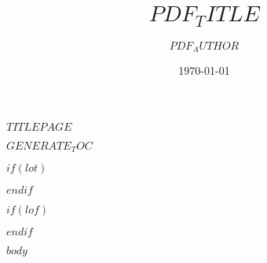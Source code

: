 \documentclass[
$FONT_SIZE$,
$if(lang)$
  $babel-lang$,
$endif$
]{scrartcl}
\date{\today}
\title{$PDF_TITLE$}
\author{$PDF_AUTHOR$}
\begin{document}
$TITLEPAGE$

$GENERATE_TOC$

$if(lot)$
\listoftables
$endif$

$if(lof)$
\listoffigures
$endif$

$body$
\end{document}
